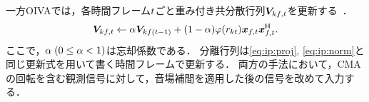 \documentclass[twocolumn,9pt,dvipdfmx]{article}
\begin{document}
一方OIVAでは，各時間フレーム$t$ごと重み付き共分散行列$\cov _{\src\ft}$を更新する~\cite{Taniguchi:2014:HSCMA}．
\begin{equation}
  \cov _{\src\ft} \gets \forget \cov _{\src\freq(\tframe-1)} + (1 - \forget) \weight ({\var _{\src\tframe}}) \Obs _{\ft} \Obs _{\ft}^{\hermite}.
\end{equation}
ここで，$\alpha\; (0 \leq \alpha < 1)$は忘却係数である．
分離行列は\cref{eq:ip:proj}, \cref{eq:ip:norm}と同じ更新式を用いて書く時間フレームで更新する．
両方の手法において，CMAの回転を含む観測信号に対して，音場補間を適用した後の信号を改めて入力する．



\end{document}
